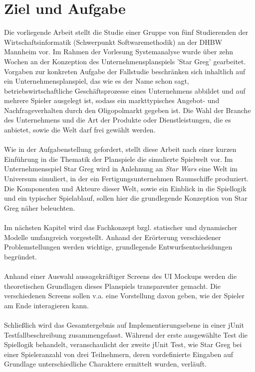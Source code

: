 \section{Ziel und Aufgabe}
\label{sec:einleitung-ziel}

Die vorliegende Arbeit stellt die Studie einer Gruppe von fünf Studierenden der Wirtschaftsinformatik (Schwerpunkt Softwaremethodik) an der DHBW Mannheim vor. Im Rahmen der Vorlesung Systemanalyse wurde über zehn Wochen an der Konzeption des Unternehmensplanspiels 'Star Greg' gearbeitet. Vorgaben zur konkreten Aufgabe der Fallstudie beschränken sich inhaltlich auf ein Unternehmensplanspiel, das wie es der Name schon sagt, betriebswirtschaftliche Geschäftsprozesse eines Unternehmens abbildet und auf mehrere Spieler ausgelegt ist, sodass ein markttypisches Angebot- und Nachfrageverhalten durch den Oligopolmarkt gegeben ist. Die Wahl der Branche des Unternehmens und die Art der Produkte oder Dienstleistungen, die es anbietet, sowie die Welt darf frei gewählt werden.
\\
\\
Wie in der Aufgabenstellung gefordert, stellt diese Arbeit nach einer kurzen Einführung in die Thematik der Planspiele die simulierte Spielwelt vor. Im Unternehmensspiel Star Greg wird in Anlehnung an \textit{Star Wars} eine Welt im Universum simuliert, in der ein Fertigungsunternehmen Raumschiffe produziert. Die Komponenten und Akteure dieser Welt, sowie ein Einblick in die Spiellogik und ein typischer Spielablauf, sollen hier die grundlegende Konzeption von Star Greg näher beleuchten.  
\\
\\
Im nächsten Kapitel wird das Fachkonzept bzgl. statischer und dynamischer Modelle umfangreich vorgestellt. Anhand der Erörterung verschiedener Problemstellungen werden wichtige, grundlegende Entwurfsentscheidungen begründet.
\\
\\
Anhand einer Auswahl aussagekräftiger Screens des UI Mockups werden die theoretischen Grundlagen dieses Planspiels transparenter gemacht. Die verschiedenen Screens sollen v.a. eine Vorstellung davon geben, wie der Spieler am Ende interagieren kann. 
\\
\\
Schließlich wird das Gesamtergebnis auf Implementierungsebene in einer  jUnit Testfallbeschreibung zusammengefasst. Während der erste ausgewählte Test die Spiellogik behandelt, veranschaulicht der zweite jUnit Test, wie Star Greg bei einer Spieleranzahl von drei Teilnehmern, deren vordefinierte Eingaben auf Grundlage unterschiedliche Charaktere ermittelt wurden, verläuft. 


